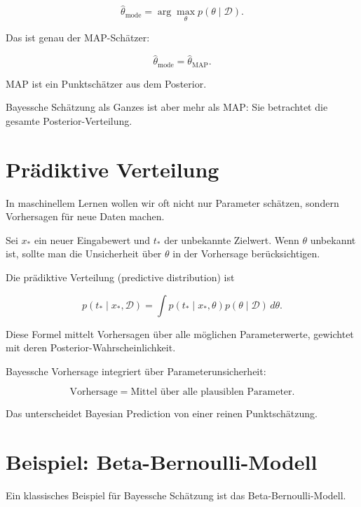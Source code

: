 \[
    \hat{\theta}_{\mathrm{mode}}
    =
    \arg\max_{\theta}
    p(\theta \mid \mathcal{D}).
\]

Das ist genau der MAP-Schätzer:

\[
    \hat{\theta}_{\mathrm{mode}}
    =
    \hat{\theta}_{\mathrm{MAP}}.
\]

\begin{notebox}
MAP ist ein Punktschätzer aus dem Posterior.

Bayessche Schätzung als Ganzes ist aber mehr als MAP:
Sie betrachtet die gesamte Posterior-Verteilung.
\end{notebox}

\section{Prädiktive Verteilung}

In maschinellem Lernen wollen wir oft nicht nur Parameter schätzen, sondern Vorhersagen für neue Daten machen.

Sei \(x_*\) ein neuer Eingabewert und \(t_*\) der unbekannte Zielwert.
Wenn \(\theta\) unbekannt ist, sollte man die Unsicherheit über \(\theta\) in der Vorhersage berücksichtigen.

\begin{definitionbox}
Die prädiktive Verteilung (predictive distribution) ist

\[
    p(t_* \mid x_*,\mathcal{D})
    =
    \int
    p(t_* \mid x_*,\theta)
    p(\theta \mid \mathcal{D})
    \,d\theta.
\]
\end{definitionbox}

Diese Formel mittelt Vorhersagen über alle möglichen Parameterwerte, gewichtet mit deren Posterior-Wahrscheinlichkeit.

\begin{conceptbox}
Bayessche Vorhersage integriert über Parameterunsicherheit:

\[
    \text{Vorhersage}
    =
    \text{Mittel über alle plausiblen Parameter}.
\]

Das unterscheidet Bayesian Prediction von einer reinen Punktschätzung.
\end{conceptbox}

\section{Beispiel: Beta-Bernoulli-Modell}

Ein klassisches Beispiel für Bayessche Schätzung ist das Beta-Bernoulli-Modell.

